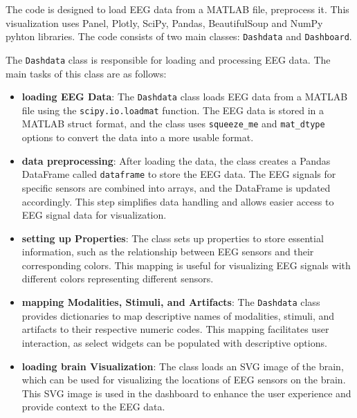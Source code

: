\documentclass[format=sigconf]{acmart}
\begin{document}
			\par The code is designed to load EEG data from a MATLAB file, preprocess it. This visualization uses Panel, Plotly, SciPy, Pandas, BeautifulSoup and NumPy pyhton libraries. The code consists of two main classes: \texttt{Dashdata} and \texttt{Dashboard}.
			
			\par The \texttt{Dashdata} class is responsible for loading and processing EEG data. The main tasks of this class are as follows:
			
			
			
			
			\begin{itemize}
				
				\item{\textbf{loading EEG Data}}: The \texttt{Dashdata} class loads EEG data from a MATLAB file using the \texttt{scipy.io.loadmat} function. The EEG data is stored in a MATLAB struct format, and the class uses \texttt{squeeze\_me} and \texttt{mat\_dtype} options to convert the data into a more usable format.
			
				\item{\textbf{data preprocessing}}: After loading the data, the class creates a Pandas DataFrame called \texttt{dataframe} to store the EEG data. The EEG signals for specific sensors are combined into arrays, and the DataFrame is updated accordingly. This step simplifies data handling and allows easier access to EEG signal data for visualization.
				
				\item{\textbf{setting up Properties}}: The class sets up properties to store essential information, such as the relationship between EEG sensors and their corresponding colors. This mapping is useful for visualizing EEG signals with different colors representing different sensors.
				
				\item{\textbf{mapping Modalities, Stimuli, and Artifacts}}: The \texttt{Dashdata} class provides dictionaries to map descriptive names of modalities, stimuli, and artifacts to their respective numeric codes. This mapping facilitates user interaction, as select widgets can be populated with descriptive options.
				
				\item{\textbf{loading brain Visualization}}: The class loads an SVG image of the brain, which can be used for visualizing the locations of EEG sensors on the brain. This SVG image is used in the dashboard to enhance the user experience and provide context to the EEG data.
			\end{itemize}
			
\end{document}
